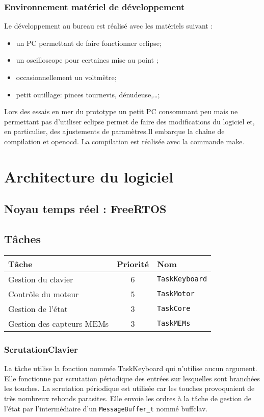 \documentclass[a4paper,11pt]{report}
\begin{document}
\subsection{Environnement matériel de développement}
Le développement au bureau est réalisé avec les matériels suivant :
\begin{itemize}
	\item un PC permettant de faire fonctionner eclipse;
	\item un oscilloscope pour certaines mise au point ;
	\item occasionnellement un voltmètre;
	\item petit outillage: pinces tournevis, dénudeuse,\ldots;
\end{itemize}
Lors des essais en mer du prototype un petit PC consommant peu
mais ne permettant pas d'utiliser eclipse permet de faire des
modifications du logiciel et, en particulier, des ajustements
de paramètres.Il embarque la chaîne de compilation et openocd.
La compilation est réalisée avec la commande make.
\chapter{Architecture du logiciel}
\section{Noyau temps réel : FreeRTOS}
\section{Tâches}
\begin{tabular}{|l|c|l|}
\hline 
Tâche & Priorité & Nom \\
\hline 
Gestion du clavier & 6 & \texttt{TaskKeyboard}\\
Contrôle du moteur & 5 & \texttt{TaskMotor}\\
Gestion de l'état & 3 & \texttt{TaskCore}\\
Gestion des capteurs MEMs & 3 & \texttt{TaskMEMs}\\
\hline 
\end{tabular} 
\subsection{ScrutationClavier}
La tâche utilise la fonction nommée TaskKeyboard qui n'utilise aucun argument.
Elle fonctionne par scrutation périodique des entrées sur lesquelles sont branchées les touches.
La scrutation périodique est utilisée car les touches provoquaient de très nombreux
rebonds parasites. 
Elle envoie les ordres à la tâche de gestion de l'état
par l'intermédiaire d'un \texttt{MessageBuffer\_t} nommé buffclav.
\end{document}
